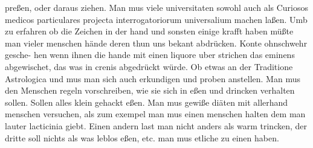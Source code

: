pre{\ss}en, oder daraus ziehen. Man mus viele universitaten sowohl auch als Curiosos medicos\protect{} particulares projecta interrogatoriorum universalium machen la{\ss}en.
\pend%
\pstart%
Umb zu erfahren ob die Zeichen in der hand\protect{} und sonsten einige krafft haben m\"{u}{\ss}te man vieler menschen h\"{a}nde\protect{} deren thun uns bekant abdr\"{u}cken. Konte ohnschwehr gesche-
\pend
\newpage
\pstart\noindent hen wenn ihnen die hande\protect{} mit einen liquore\protect{} uber strichen das eminens abgewischet, das was in crenis abgedr\"{u}ckt w\"{u}rde.
%
\pend%
\count{}
\count{}
\count{}
\pstart%
Ob etwas an der Traditione Astrologica und
%
mus man sich auch erkundigen und proben anstellen.
\pend
\pstart%
Man mus den Menschen regeln vorschreiben, wie sie sich in e{\ss}en und drincken verhalten sollen. Sollen alles klein gehackt e{\ss}en.
\pend%
\pstart%
Man mus gewi{\ss}e di\"{a}ten\protect{} mit allerhand menschen versuchen, als zum exempel man mus einen menschen halten dem man lauter lacticinia\protect{} giebt. Einen andern last man nicht anders als warm trincken, der dritte soll nichts als was leblos e{\ss}en, etc. man mus etliche zu einen haben.%
